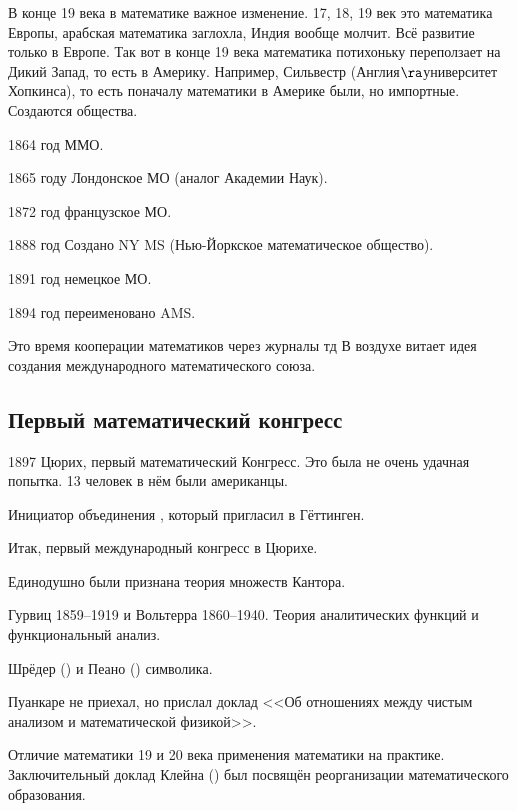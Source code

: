 \documentclass[a4paper,oneside,fleqn,10pt]{article}
\begin{document}
В конце 19 века в математике важное изменение. 17, 18, 19 век это математика Европы,
арабская математика заглохла, Индия вообще молчит. Всё развитие только в Европе.
Так вот в конце 19 века математика потихоньку переползает на Дикий Запад, то есть в Америку.
Например, Сильвестр (Англия$\ra$университет Хопкинса), то есть поначалу математики в Америке были,
но импортные. Создаются общества.

\begin{items}{-2}
\item 1864 год ММО.
\item 1865 году Лондонское МО (аналог Академии Наук).
\item 1872 год французское МО.
\item 1888 год Создано NY MS (Нью-Йоркское математическое общество).
\item 1891 год немецкое МО.
\item 1894 год переименовано AMS.
\end{items}

Это время кооперации математиков через журналы тд В воздухе витает идея создания
международного математического союза.

\subsection{Первый математический конгресс}

1897 Цюрих, первый математический Конгресс. Это была не очень удачная попытка.
13 человек в нём были американцы.

Инициатор объединения , который пригласил 
в Гёттинген.

Итак, первый международный конгресс в Цюрихе.

\begin{items}{-2}
\item Единодушно были признана теория множеств Кантора.
\item Гурвиц 1859--1919 и Вольтерра 1860--1940. Теория аналитических функций и функциональный анализ.
\item Шрёдер () и Пеано () символика.
\item Пуанкаре не приехал, но прислал доклад <<Об отношениях между чистым анализом
и математической физикой>>.
\end{items}

Отличие математики 19 и 20 века применения математики на практике.
Заключительный доклад Клейна () был посвящён реорганизации математического образования.
\end{document}
